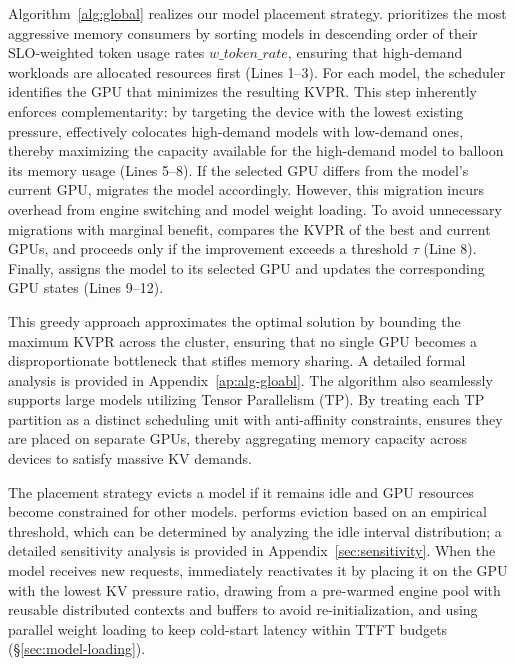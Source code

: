 Algorithm~\ref{alg:global} realizes our model placement strategy. \tool prioritizes the most aggressive memory consumers by sorting models in descending order of their SLO-weighted token usage rates $w\_token\_rate$, ensuring that high-demand workloads are allocated resources first (Lines 1–3). For each model, the scheduler identifies the GPU that minimizes the resulting KVPR. This step inherently enforces complementarity: by targeting the device with the lowest existing pressure, \tool effectively colocates high-demand models with low-demand ones, thereby maximizing the capacity available for the high-demand model to balloon its memory usage (Lines 5–8). 
If the selected GPU differs from the model's current GPU, \tool migrates the model accordingly. However, this migration incurs overhead from engine switching and model weight loading.
To avoid unnecessary migrations with marginal benefit, \tool compares the KVPR of the best and current GPUs, and proceeds only if the improvement exceeds a threshold $\tau$ (Line 8).
Finally, \tool assigns the model to its selected GPU and updates the corresponding GPU states (Lines 9–12).

 This greedy approach approximates the optimal solution by bounding the maximum KVPR across the cluster, ensuring that no single GPU becomes a disproportionate bottleneck that stifles memory sharing. A detailed formal analysis is provided in Appendix~\ref{ap:alg-gloabl}. The algorithm also seamlessly supports large models utilizing Tensor Parallelism (TP). By treating each TP partition as a distinct scheduling unit with anti-affinity constraints, \tool ensures they are placed on separate GPUs, thereby aggregating memory capacity across devices to satisfy massive KV demands. 

The placement strategy evicts a model if it remains idle and GPU resources become constrained for other models. \tool performs eviction based on an empirical threshold, which can be determined by analyzing the idle interval distribution; a detailed sensitivity analysis is provided in Appendix~\ref{sec:sensitivity}.
When the model receives new requests, \tool immediately reactivates it by placing it on the GPU with the lowest KV pressure ratio, drawing from a pre-warmed engine pool with reusable distributed contexts and buffers to avoid re-initialization, and using parallel weight loading to keep cold-start latency within TTFT budgets (\S\ref{sec:model-loading}).

